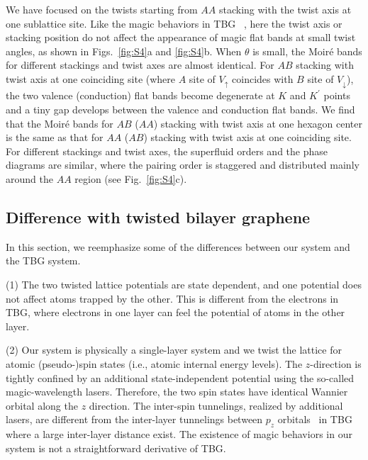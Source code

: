 \documentclass[twocolumn,english,prl,floatfix,citeautoscript,nofootinbib]{revtex4}
\begin{document}
\begin{widetext}
We have focused on the twists starting from $AA$ stacking with the twist
axis at one sublattice site. Like the magic behaviors in TBG~\cite%
{PhysRevLett.99.256802S,PhysRevB.81.165105S,PNAS.108.12233S,PhysRevB.86.155449S}%
, here the twist axis or stacking position do not affect the appearance of
magic flat bands at small twist angles, as shown in Figs.~\ref{fig:S4}a and %
\ref{fig:S4}b. When $\theta $ is small, the Moir\'{e} bands for different
stackings and twist axes are almost identical. For $AB$ stacking with twist
axis at one coinciding site (where $A$ site of $V_{\uparrow }$ coincides
with $B$ site of $V_{\downarrow }$), the two valence (conduction) flat bands
become degenerate at $K$ and $K^{\prime }$ points and a tiny gap develops
between the valence and conduction flat bands. We find that the Moir\'{e}
bands for $AB$ ($AA$) stacking with twist axis at one hexagon center is the
same as that for $AA$ ($AB$) stacking with twist axis at one coinciding
site. For different stackings and twist axes, the superfluid orders and the
phase diagrams are similar, where the pairing order is staggered and
distributed mainly around the $AA$ region (see Fig.~\ref{fig:S4}c).

\subsection{Difference with twisted bilayer graphene}

In this section, we reemphasize some of the differences between our system
and the TBG system.

(1) The two twisted lattice potentials are state dependent, and one
potential does not affect atoms trapped by the other. This is different from
the electrons in TBG, where electrons in one layer can feel the potential of
atoms in the other layer.

(2) Our system is physically a single-layer system and we twist the lattice
for atomic (pseudo-)spin states (i.e., atomic internal energy levels). The $%
z $-direction is tightly confined by an additional state-independent
potential using the so-called magic-wavelength lasers. Therefore, the two
spin states have identical Wannier orbital along the $z$ direction. The
inter-spin tunnelings, realized by additional lasers, are different from the
inter-layer tunnelings between $p_{z}$ orbitals~\cite%
{PhysRevLett.99.256802S,PhysRevB.81.165105S} in TBG where a large
inter-layer distance exist. The existence of magic behaviors in our system
is not a straightforward derivative of TBG.


\end{widetext}
\end{document}
